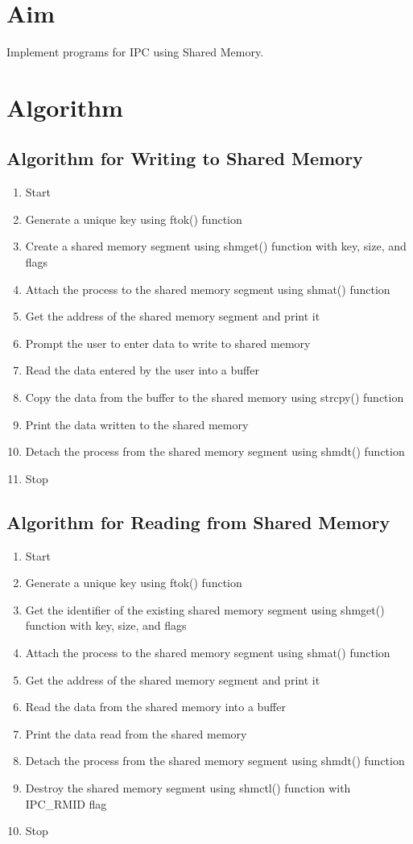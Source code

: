 
\section{Aim}
Implement programs for IPC using Shared Memory.

\section{Algorithm}
\subsection{Algorithm for Writing to Shared Memory}
\begin{enumerate}
   \item Start
   \item Generate a unique key using ftok() function
   \item Create a shared memory segment using shmget() function with key, size, and flags
   \item Attach the process to the shared memory segment using shmat() function
   \item Get the address of the shared memory segment and print it
   \item Prompt the user to enter data to write to shared memory
   \item Read the data entered by the user into a buffer
   \item Copy the data from the buffer to the shared memory using strcpy() function
   \item Print the data written to the shared memory
   \item Detach the process from the shared memory segment using shmdt() function
   \item Stop
\end{enumerate}

\subsection{Algorithm for Reading from Shared Memory}
\begin{enumerate}
   \item Start
   \item Generate a unique key using ftok() function
   \item Get the identifier of the existing shared memory segment using shmget() function with key, size, and flags
   \item Attach the process to the shared memory segment using shmat() function
   \item Get the address of the shared memory segment and print it
   \item Read the data from the shared memory into a buffer
   \item Print the data read from the shared memory
   \item Detach the process from the shared memory segment using shmdt() function
   \item Destroy the shared memory segment using shmctl() function with IPC\_RMID flag
   \item Stop
\end{enumerate}

